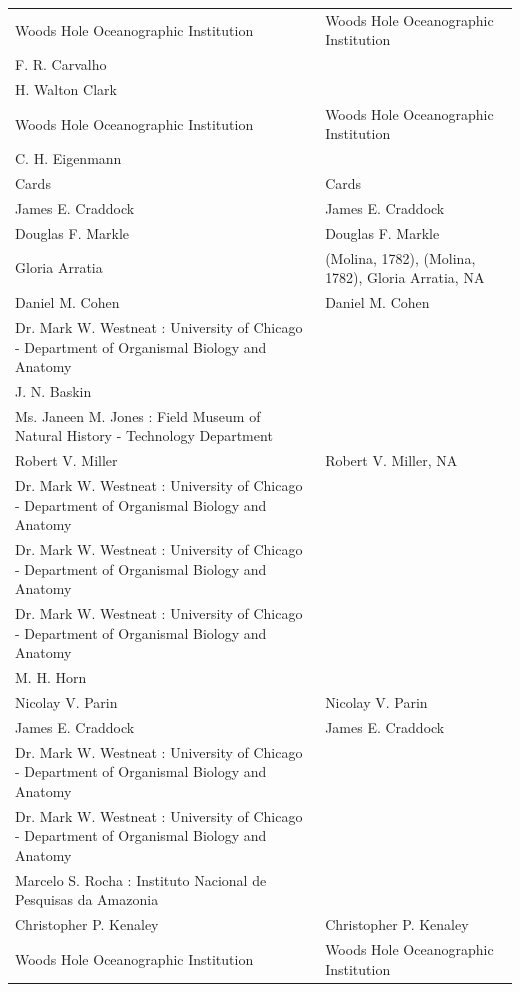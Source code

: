 \documentclass[sn-apa,pdflatex]{sn-jnl}
\begin{document}
\begin{longtable}[t]{>{\raggedright\arraybackslash}p{25em}>{\raggedright\arraybackslash}p{25em}}
Woods Hole Oceanographic Institution & Woods Hole Oceanographic \vphantom{6} Institution\\
F. R. Carvalho & \\
H. Walton Clark \vphantom{2} & \\
Woods Hole Oceanographic Institution & Woods Hole Oceanographic \vphantom{5} Institution\\
\addlinespace
C. H. Eigenmann \vphantom{1} & \\
Cards & \vphantom{1} Cards\\
James E. Craddock & James E. \vphantom{3} Craddock\\
Douglas F. Markle & Douglas F. \vphantom{2} Markle\\
Gloria Arratia & (Molina, 1782), (Molina, 1782), Gloria Arratia, NA\\
\addlinespace
Daniel M. Cohen & Daniel M. Cohen\\
Dr. Mark W. Westneat : University of Chicago - Department of Organismal Biology and Anatomy \vphantom{10} & \\
J. N. Baskin & \\
Ms. Janeen M. Jones : Field Museum of Natural History - Technology Department & \\
Robert V. Miller & Robert V. Miller, NA\\
\addlinespace
Dr. Mark W. Westneat : University of Chicago - Department of Organismal Biology and Anatomy \vphantom{9} & \\
Dr. Mark W. Westneat : University of Chicago - Department of Organismal Biology and Anatomy \vphantom{8} & \\
Dr. Mark W. Westneat : University of Chicago - Department of Organismal Biology and Anatomy \vphantom{7} & \\
M. H. Horn & \\
Nicolay V. Parin & Nicolay V. \vphantom{1} Parin\\
\addlinespace
James E. Craddock & James E. \vphantom{2} Craddock\\
Dr. Mark W. Westneat : University of Chicago - Department of Organismal Biology and Anatomy \vphantom{6} & \\
Dr. Mark W. Westneat : University of Chicago - Department of Organismal Biology and Anatomy \vphantom{5} & \\
Marcelo S. Rocha : Instituto Nacional de Pesquisas da Amazonia & \\
Christopher P. Kenaley & Christopher P. Kenaley\\
\addlinespace
Woods Hole Oceanographic Institution & Woods Hole Oceanographic \vphantom{4} Institution\\

\end{longtable}
\end{document}
